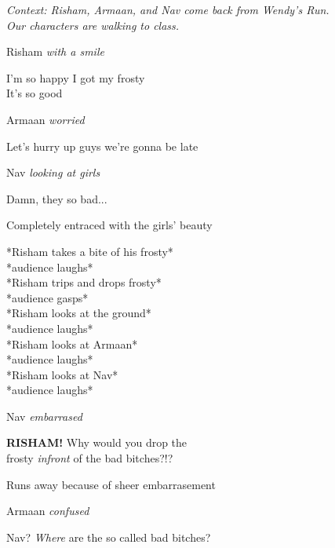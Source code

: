 \documentclass[12pt]{article}
\begin{document}
\begin{center}
    \textit{Context: Risham, Armaan, and Nav come back from Wendy's Run.\\Our characters are walking to class.}
\end{center}

Risham
\textit{  with a smile}
\begin{center}
    I'm so happy I got my frosty\\It's so good
\end{center}

Armaan
\textit{  worried}
\begin{center}
    Let's hurry up guys we're gonna be late
\end{center}

Nav
\textit{  looking at girls}
\begin{center}
    Damn, they so bad...
\end{center}
\begin{flushright}
    Completely entraced with the girls' beauty\\
\end{flushright}

\begin{center}
    *Risham takes a bite of his frosty*\\*audience laughs*\\*Risham trips and drops frosty*\\*audience gasps*\\*Risham looks at the ground*\\*audience laughs*\\*Risham looks at Armaan*\\*audience laughs*\\*Risham looks at Nav*\\*audience laughs*\\
\end{center}

Nav
\textit{  embarrased}
\begin{center}
    \textbf{RISHAM!} Why would you drop the \\frosty \textit{infront} of the bad bitches?!?
\end{center}
\begin{flushright}
    Runs away because of sheer embarrasement
\end{flushright}

Armaan
\textit{  confused}
\begin{center}
    Nav? \textit{Where} are the so called bad bitches?
\end{center}
\end{document}
